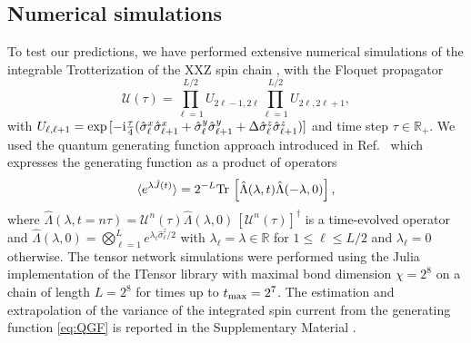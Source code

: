 \documentclass[
twocolumn,
amsfonts,
showpacs,
superscriptaddress,
amsmath,
amssymb,
aps,
longbibliography,
prl,
noeprint
]{revtex4-2}
\newcommand{\ii}{{\rm i}}
\newcommand{\1}{{\bf 1}}
\begin{document}
\subsection{Numerical simulations}
To test our predictions, we have performed extensive numerical simulations of the integrable Trotterization of the XXZ spin chain \cite{Vanicat2017,Ljubotina2019}, with the Floquet propagator
\begin{equation}
    \mathcal{U}(\tau) = \prod_{\ell = 1}^{L/2} U_{2\ell-1, 2\ell}
    \prod_{\ell = 1}^{L/2} U_{2\ell, 2\ell+1},
\end{equation}
with $U_{\ell, \ell+1} = \exp{[-\ii \tfrac{\tau}{4}(\hat{\sigma}^x_\ell\hat{\sigma}^x_{\ell+1}+\hat{\sigma}^y_\ell\hat{\sigma}^y_{\ell+1}+\Delta \hat{\sigma}^z_\ell\hat{\sigma}^z_{\ell+1})]}$ and time step $\tau \in \mathbb{R}_+$.
We used the quantum generating function approach introduced in Ref.~\cite{Valli_2025} which expresses the generating function as a product of operators
\begin{equation}
\langle e^{\lambda \hat{J}(t)} \rangle = 2^{-L} {\rm Tr}\, \left[ \hat \Lambda(\lambda, t) \hat \Lambda(-\lambda, 0)\right], \label{eq:QGF}
\end{equation}
where $\hat \Lambda (\lambda,t=n\tau) = \mathcal{U}^n(\tau) \hat \Lambda(\lambda, 0)\, [\mathcal{U}^n(\tau)]^\dagger$ is a time-evolved operator and $\hat \Lambda(\lambda, 0) = \bigotimes_{\ell = 1}^{L} e^{\lambda_\ell \hat{\sigma}^z_\ell/2}$ with $\lambda_\ell = \lambda \in \mathbb{R}$ for $1 \leq \ell \leq L/2$ and $\lambda_\ell = 0$ otherwise.
The tensor network simulations were performed using the Julia implementation of the ITensor library \cite{itensor,itensor-r0.3} with maximal bond dimension $\chi = 2^8$ on a chain of length $L = 2^8$ for times up to $t_{\rm max}=2^7$. The estimation and extrapolation of the variance of the integrated spin current from the generating function \eqref{eq:QGF} is reported in the Supplementary Material \cite{SM}.

\appendix
\end{document}
